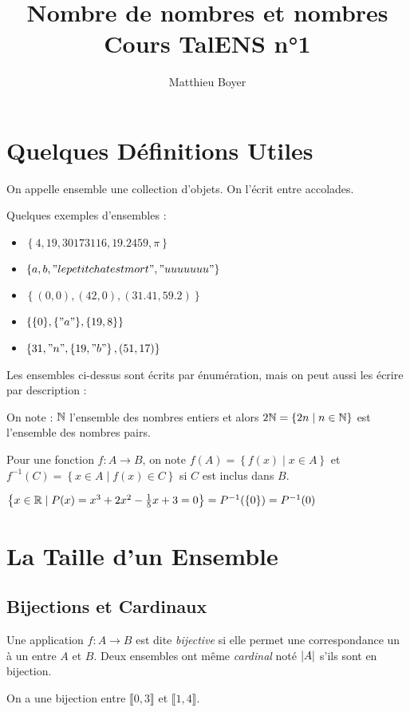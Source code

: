 \documentclass{cours}
\title{Nombre de nombres et nombres\\ \small Cours TalENS n°1}
\author{Matthieu Boyer}
\date{}
\begin{document}
    \section{Quelques Définitions Utiles}
    \begin{definition}
        On appelle ensemble une collection d'objets. On l'écrit entre accolades. 
    \end{definition}
    \begin{example}
        Quelques exemples d'ensembles : 
        \begin{itemize}
            \item $\left\{4, 19, 30173116, 19.2459, \pi\right\} $
            \item $\left\{a, b, "le petit chat est mort", "uuuuuuu"\right\}$
            \item $\left\{(0,0), (42, 0), (31.41, 59.2)\right\}$
            \item $\left\{\{0\}, \{"a"\}, \{19, 8\}\right\}$
            \item $\left\{31, "n", \left\{19, "b"\right\}, (51, 17)\right\}$
        \end{itemize}
    \end{example}
    Les ensembles ci-dessus sont écrits par énumération, mais on peut aussi les écrire par description : 
    \begin{definition}
        On note : $\mathbb{N}$ l'ensemble des nombres entiers et alors $2\mathbb{N} = \left\{2n \mid n \in \mathbb{N}\right\}$ est l'ensemble des nombres pairs.
    \end{definition}

    \begin{definition}
        Pour une fonction $f : A \rightarrow B$, on note $f(A) = \left\{f(x) \mid x \in A\right\}$ et $f^{-1}(C) = \left\{x \in A \mid f(x) \in C\right\}$ si $C$ est inclus dans $B$.
    \end{definition}
    \begin{example}
        $\left\{x \in \mathbb{R} \mid P(x) = x^{3} + 2x^{2} - \frac{1}{5}x + 3 = 0\right\} = P^{-1}(\{0\}) = P^{-1}(0)$
    \end{example}

    \section{La Taille d'un Ensemble}
    \subsection{Bijections et Cardinaux}
    \begin{definition}
        Une application $f : A \rightarrow B$ est dite \emph{bijective} si elle permet une correspondance un à un entre $A$ et $B$. Deux ensembles ont même \emph{cardinal} noté $\left|A\right|$ s'ils sont en bijection.    
    \end{definition}
    \begin{example}
        On a une bijection entre $\llbracket 0, 3\rrbracket$ et $\llbracket 1, 4\rrbracket$.
    \end{example}
\end{document}
